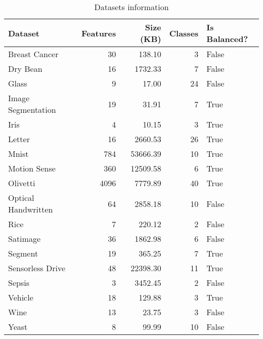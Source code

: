 \begin{table}
\centering
\caption{Datasets information}
\label{tab:datasets_info}
\begin{tabular}{lrrrl}
\toprule
            Dataset &  Features &  Size (KB) &  Classes &  Is Balanced? \\
\midrule
      Breast Cancer &        30 &     138.10 &        3 &         False \\
           Dry Bean &        16 &    1732.33 &        7 &         False \\
              Glass &         9 &      17.00 &       24 &         False \\
 Image Segmentation &        19 &      31.91 &        7 &          True \\
               Iris &         4 &      10.15 &        3 &          True \\
             Letter &        16 &    2660.53 &       26 &          True \\
              Mnist &       784 &   53666.39 &       10 &          True \\
       Motion Sense &       360 &   12509.58 &        6 &          True \\
           Olivetti &      4096 &    7779.89 &       40 &          True \\
Optical Handwritten &        64 &    2858.18 &       10 &         False \\
               Rice &         7 &     220.12 &        2 &         False \\
           Satimage &        36 &    1862.98 &        6 &         False \\
            Segment &        19 &     365.25 &        7 &          True \\
   Sensorless Drive &        48 &   22398.30 &       11 &          True \\
             Sepsis &         3 &    3452.45 &        2 &         False \\
            Vehicle &        18 &     129.88 &        3 &          True \\
               Wine &        13 &      23.75 &        3 &         False \\
              Yeast &         8 &      99.99 &       10 &         False \\
\bottomrule
\end{tabular}
\end{table}
